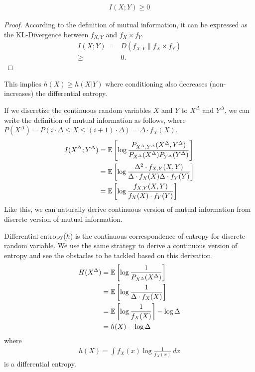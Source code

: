 \documentclass{article}
\begin{document}
\begin{theorem} 
\begin{align}
    I(X;Y)\ge0
\end{align}  
\end{theorem}


\begin{proof} 
According to the definition of mutual information, it can be expressed as the KL-Divergence between $f_{X,Y}$ and $f_X\times f_Y$.
    \begin{align}
        I(X;Y) 
        =& D(f_{X,Y}\parallel f_X\times f_Y) \\
        \geq& 0.
    \end{align}
\end{proof}
This implies $h(X) \geq h(X|Y)$ where conditioning also decreases (non-increases) the differential entropy.



If we discretize the continuous random variables $X$ and $Y$ to $X^{\Delta}$ and 
$Y^{\Delta}$, we can write the definition of mutual information as follows, 
where $P(X^{\Delta})=P(i\cdot\Delta \leq  X \leq (i+1)\cdot \Delta)=\Delta \cdot f_X(X)$. 
\begin{equation}
\begin{split}
I(X^{\Delta};Y^{\Delta}) &= \mathbb{E} \left[ \log{P_{X^{\Delta}, Y^{\Delta}}(X^{\Delta}, Y^{\Delta}) \over P_{X^{\Delta}}(X^{\Delta})P_{Y^{\Delta}}(Y^{\Delta})} \right] \\
       &= \mathbb{E} \left[ \log{ \Delta^2 \cdot f_{X,Y}(X,Y) \over  \Delta \cdot f_{X}(X)\Delta\cdot f_{Y}(Y)} \right] \\    
       &= \mathbb{E} \left[ \log{ f_{X,Y}(X,Y) \over f_X(X) \cdot f_Y(Y)} \right]
\end{split}
\end{equation}
Like this, we can naturally derive continuous version of mutual information from discrete 
version of mutual information.

Differential entropy($h$) is the continuous correspondence of entropy for discrete 
random variable.
We use the same strategy to derive a continuous version of entropy and see the obstacles
to be tackled based on this derivation. 
\begin{equation}
\begin{split}
    H(X^{\Delta}) &= \mathbb{E}\left[ \log{1 \over P_{X^{\Delta}}(X^{\Delta})} \right] \\
                  &= \mathbb{E}\left[ \log{1 \over \Delta \cdot f_X(X)} \right] \\
                  &= \mathbb{E}\left[ \log{1 \over f_X(X)} \right] - \log \Delta \\
                  &= h(X) - \log \Delta
\end{split}
\end{equation}
where
\begin{align}
    h(X) = \int f_X(x) \log \frac{1}{f_X(x)}\, dx
\end{align}
is a differential entropy.
\end{document}
